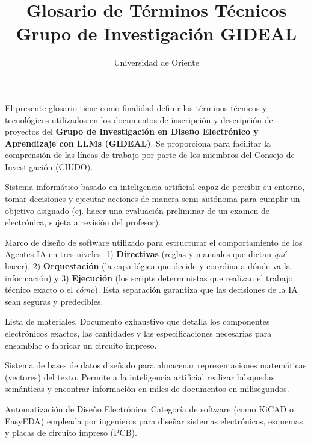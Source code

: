 \documentclass[12pt, a4paper]{article}
\title{\textbf{Glosario de Términos Técnicos}\\Grupo de Investigación GIDEAL}
\author{Universidad de Oriente \vspace{-0.5cm}}
\date{}
\begin{document}
\maketitle

\noindent
El presente glosario tiene como finalidad definir los términos técnicos y tecnológicos utilizados en los documentos de inscripción y descripción de proyectos del \textbf{Grupo de Investigación en Diseño Electrónico y Aprendizaje con LLMs (GIDEAL)}. Se proporciona para facilitar la comprensión de las líneas de trabajo por parte de los miembros del Consejo de Investigación (CIUDO).

\vspace{0.5cm}

\begin{description}[style=nextline, leftmargin=1.5em, itemsep=0.8em]

    \item[Agente IA (Agente Inteligente)] 
    Sistema informático basado en inteligencia artificial capaz de percibir su entorno, tomar decisiones y ejecutar acciones de manera semi-autónoma para cumplir un objetivo asignado (ej. hacer una evaluación preliminar de un examen de electrónica, sujeta a revisión del profesor).

    \item[Arquitectura de 3 Capas] 
    Marco de diseño de software utilizado para estructurar el comportamiento de los Agentes IA en tres niveles: 1) \textbf{Directivas} (reglas y manuales que dictan \textit{qué} hacer), 2) \textbf{Orquestación} (la capa lógica que decide y coordina a dónde va la información) y 3) \textbf{Ejecución} (los scripts deterministas que realizan el trabajo técnico exacto o el \textit{cómo}). Esta separación garantiza que las decisiones de la IA sean seguras y predecibles.

    \item[BOM (Bill of Materials)] 
    Lista de materiales. Documento exhaustivo que detalla los componentes electrónicos exactos, las cantidades y las especificaciones necesarias para ensamblar o fabricar un circuito impreso.

    \item[ChromaDB / Base de Datos Vectorial] 
    Sistema de bases de datos diseñado para almacenar representaciones matemáticas (vectores) del texto. Permite a la inteligencia artificial realizar búsquedas semánticas y encontrar información en miles de documentos en milisegundos.

    \item[EDA (Electronic Design Automation)] 
    Automatización de Diseño Electrónico. Categoría de software (como KiCAD o EasyEDA) empleada por ingenieros para diseñar sistemas electrónicos, esquemas y placas de circuito impreso (PCB).


\end{description}
\end{document}
